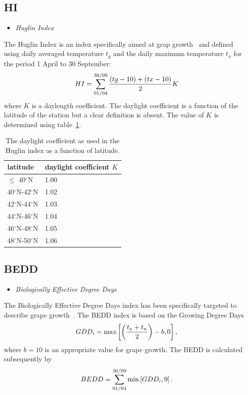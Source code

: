 \documentclass[a4paper,11pt]{article}
\newcommand{\dN}{$^{\circ}$N}
\begin{document}
\subsection*{HI}
\begin{itemize}
\item \textit{Huglin Index}
\end{itemize}
The Huglin Index is an index specifically aimed at grap growth~\citep{huglin:78} and defined 
using daily averaged temperature $t_g$ and the daily maximum
temperature $t_x$ for the period 1 April to 30 September:
\begin{equation}
HI = \sum_{01/04}^{30/09} {(tg - 10) + (tx - 10) \over 2} K \notag
\end{equation}
where $K$ is a daylength coefficient. The daylight coefficient is a function of the latitude of the station
but a  clear definition is absent. The value of $K$ is determined using table~\ref{table:daylightcoef}.

\begin{table} [!h]
\begin{tabular}{l l}
latitude  & daylight coefficient $K$ \\
\hline
$\le$ 40\dN & 1.00 \\
40\dN-42\dN & 1.02 \\
42\dN-44\dN & 1.03 \\
44\dN-46\dN & 1.04 \\
46\dN-48\dN & 1.05 \\
48\dN-50\dN & 1.06 \\
\end{tabular}
\caption{The daylight coefficient as used in the Huglin index as a function of latitude.
} \label{table:daylightcoef}
\end{table}

\subsection*{BEDD}
\begin{itemize}
\item \textit{Biologically Effective Degree Days}
\end{itemize}
The Biologically Effective Degree Days index has been specifically targeted to describe grape 
growth~\citep{gladstones:92}.
The BEDD index is based on the Growing Degree Days
\begin{equation}
GDD_i= \text{max} \left[ \left({t_x + t_n \over 2} \right) -b, 0 \right], \notag
\end{equation}
where $b = 10$ is an appropriate value for grape growth.
The BEDD is calculated subsequently by 
\begin{equation}
BEDD = \sum_{01/04}^{30/09} \text{min} \left[ GDD_i, 9 \right]. \notag
\end{equation}
\end{document}
